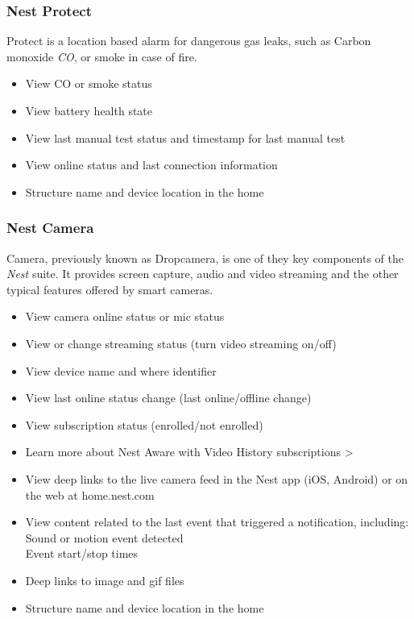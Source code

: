 \subsubsection{Nest Protect}
Protect is a location based alarm for dangerous gas leaks, such as  Carbon monoxide \textit{CO}, or
smoke in case of fire.

\begin{itemize}
    \item View CO or smoke status
    \item View battery health state
    \item View last manual test status and timestamp for last manual test
    \item View online status and last connection information
    \item Structure name and device location in the home
\end{itemize}

\subsubsection{Nest Camera}
Camera, previously known as Dropcamera, is one of they key components of the
\textit{Nest} suite. It provides screen capture, audio and video streaming and the
other typical features offered by smart cameras.

\begin{itemize}
    \item View camera online status or mic status
    \item View or change streaming status (turn video streaming on/off)
    \item View device name and where identifier
    \item View last online status change (last online/offline change)
    \item View subscription status (enrolled/not enrolled)
    \item Learn more about Nest Aware with Video History subscriptions >
    \item View deep links to the live camera feed in the Nest app (iOS, Android) or on the web at home.nest.com
    \item View content related to the last event that triggered a notification, including:
        \\Sound or motion event detected
        \\Event start/stop times
    \item Deep links to image and gif files
    \item Structure name and device location in the home

\end{itemize}



